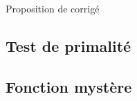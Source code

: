 
\vspace{0.1cm}
\begin{huge}
 Proposition de corrigé
\end{huge}

\subsection{Test de primalité}
\setcounter{thequestion}{0}

\subsection{Fonction mystère}
\setcounter{thequestion}{0}

